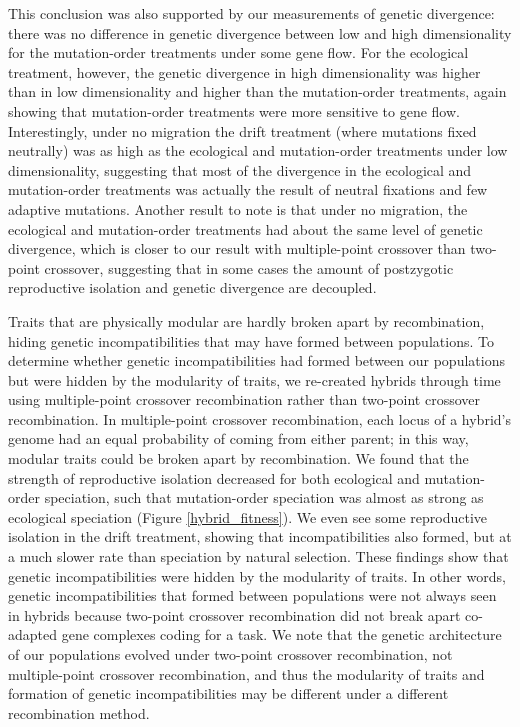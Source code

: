 \begin{doublespace}
This conclusion was also supported by our measurements of genetic divergence:
there was no difference in genetic divergence between low and high
dimensionality for the mutation-order treatments under some gene flow.
%
For the ecological treatment, however, the genetic divergence in high
dimensionality was higher than in low dimensionality and higher than the
mutation-order treatments, again showing that mutation-order treatments were
more sensitive to gene flow.
%
Interestingly, under no migration the drift treatment (where mutations fixed
neutrally) was as high as the ecological and mutation-order treatments under
low dimensionality, suggesting that most of the divergence in the ecological
and mutation-order treatments was actually the result of neutral fixations and
few adaptive mutations.
%
Another result to note is that under no migration, the ecological and
mutation-order treatments had about the same level of genetic divergence, which
is closer to our result with multiple-point crossover than two-point crossover,
suggesting that in some cases the amount of postzygotic reproductive isolation
and genetic divergence are decoupled.



Traits that are physically modular
are hardly broken apart by recombination,
hiding genetic incompatibilities
that may have formed between populations.
%
To determine whether genetic incompatibilities
had formed between our populations
but were hidden by the modularity of traits,
we re-created hybrids through time using multiple-point crossover recombination
rather than two-point crossover recombination.
%
In multiple-point crossover recombination,
each locus of a hybrid's genome had an equal probability
of coming from either parent;
in this way, modular traits could be broken apart by recombination.
%
We found that the strength of reproductive isolation
decreased for both ecological and mutation-order speciation,
such that mutation-order speciation
was almost as strong as ecological speciation (Figure \ref{hybrid_fitness}).
%
We even see some reproductive isolation in the drift treatment,
showing that incompatibilities also formed,
but at a much slower rate than speciation by natural selection.
%
These findings show that genetic incompatibilities
were hidden by the modularity of traits.
%
In other words, genetic incompatibilities that formed between populations
were not always seen in hybrids because two-point crossover recombination
did not break apart co-adapted gene complexes coding for a task.
%
We note that the genetic architecture of our populations
evolved under two-point crossover recombination,
not multiple-point crossover recombination,
and thus the modularity of traits
and formation of genetic incompatibilities
may be different under a different recombination method.




\end{doublespace}
